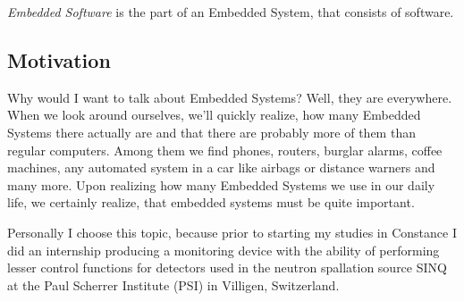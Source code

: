 \documentclass[10pt,a4paper,titlepage,draft]{scrartcl} %
\begin{document}
\emph{Embedded Software} is the part of an Embedded System, that consists of software.

\subsection{Motivation}
Why would I want to talk about Embedded Systems?
Well, they are everywhere. When we look around ourselves, we'll quickly realize, how many Embedded Systems there actually are and that there are probably more of them than regular computers.
Among them we find phones, routers, burglar alarms, coffee machines, any automated system in a car like airbags or distance warners and many more.
Upon realizing how many Embedded Systems we use in our daily life, we certainly realize, that embedded systems must be quite important.

Personally I choose this topic, because prior to starting my studies in Constance I did an internship producing a monitoring device with the ability of performing lesser control functions for detectors used in the neutron spallation source SINQ at the Paul Scherrer Institute (PSI) in Villigen, Switzerland.






\end{document}
